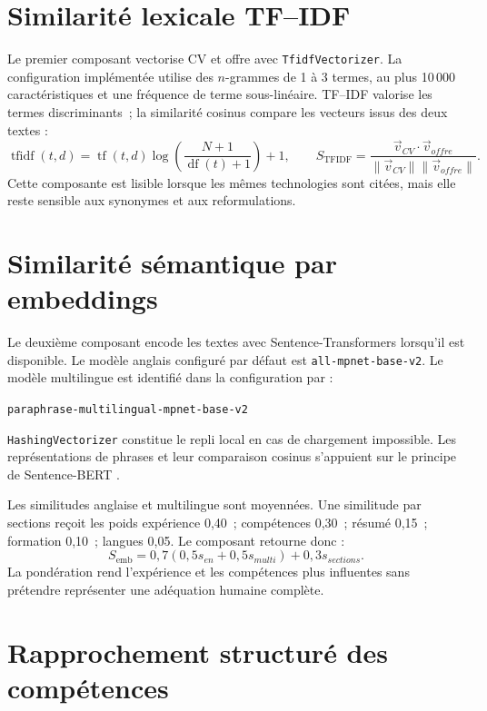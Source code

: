 \section{Similarité lexicale TF--IDF}

Le premier composant vectorise CV et offre avec \texttt{TfidfVectorizer}. La configuration implémentée utilise des $n$-grammes de 1 à 3 termes, au plus 10\,000 caractéristiques et une fréquence de terme sous-linéaire. TF--IDF valorise les termes discriminants~; la similarité cosinus compare les vecteurs issus des deux textes \cite{scikit_tfidf,scikit_cosine} :
\[
 \operatorname{tfidf}(t,d)=\operatorname{tf}(t,d)\log\left(\frac{N+1}{\operatorname{df}(t)+1}\right)+1,
 \qquad S_{\mathrm{TFIDF}}=\frac{\vec v_{CV}\cdot\vec v_{offre}}{\lVert\vec v_{CV}\rVert\lVert\vec v_{offre}\rVert}.
\]
Cette composante est lisible lorsque les mêmes technologies sont citées, mais elle reste sensible aux synonymes et aux reformulations.

\section{Similarité sémantique par embeddings}

Le deuxième composant encode les textes avec Sentence-Transformers lorsqu'il est disponible. Le modèle anglais configuré par défaut est \texttt{all-mpnet-base-v2}. Le modèle multilingue est identifié dans la configuration par :
\begin{center}
  \small\texttt{paraphrase-multilingual-mpnet-base-v2}
\end{center}
\texttt{HashingVectorizer} constitue le repli local en cas de chargement impossible. Les représentations de phrases et leur comparaison cosinus s'appuient sur le principe de Sentence-BERT \cite{reimers2019sbert}.

Les similitudes anglaise et multilingue sont moyennées. Une similitude par sections reçoit les poids expérience 0,40~; compétences 0,30~; résumé 0,15~; formation 0,10~; langues 0,05. Le composant retourne donc :
\[
 S_{\mathrm{emb}}=0{,}7\left(0{,}5s_{en}+0{,}5s_{multi}\right)+0{,}3s_{sections}.
\]
La pondération rend l'expérience et les compétences plus influentes sans prétendre représenter une adéquation humaine complète.

\section{Rapprochement structuré des compétences}


